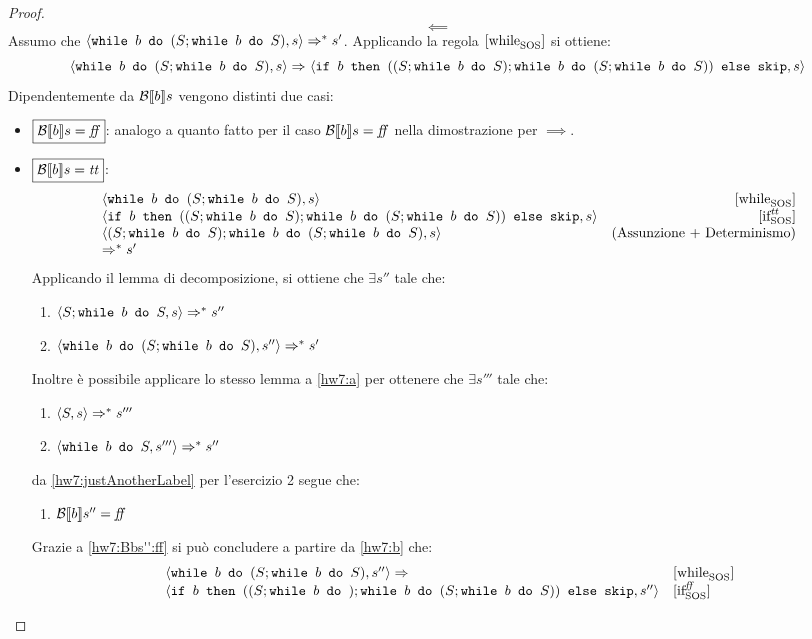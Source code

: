 {\begin{proof}
$$
\boxed{\impliedby}
$$
Assumo che $\confSs{\wbS{b}{(S;\wbS{b}{S})}}{s} \Rar{*} s'$.
Applicando la regola $\whileSOS$ si ottiene:
$$\confSs{\wbS{b}{(S;\wbS{b}{S})}}{s}
	\Rar{ }
	\confSs{\ifABC{b}{((S; \wbS{b}{S});\wbS{b}{(S;\wbS{b}{S})})}{\skipForFriends}}{s}$$
Dipendentemente da $\B{b}$ vengono distinti due casi:
\begin{itemize}
	\item $\boxed{\B{b} = \semfalse}$: analogo a quanto fatto per il caso $\B{b} = \semfalse $ nella dimostrazione per $\boxed{\implies}$. 
	\item $\boxed{\B{b} = \semtrue}$:
	$$
	\begin{array}{lr}
	\confSs{\wbS{b}{(S; \wbS{b}{S})}}{s} & \whileSOS \\
	\confSs{\ifABC{b}{((S; \wbS{b}{S});\wbS{b}{(S;\wbS{b}{S})})}{\skipForFriends}}{s} & \ifttSOS \\
	\confSs{(S; \wbS{b}{S}); \wbS{b}{(S; \wbS{b}{S})}}{s} & \text{(Assunzione + Determinismo)}\\
	\Rar{*} s'
	\end{array}
	$$
	Applicando il lemma di decomposizione, si ottiene che $\exists s''$ tale che:
	\begin{enumerate}[label=(\arabic*)]
		\item $\confSs{S; \wbS{b}{S}}{s} \Rar{*} s''$
		\label{hw7:a}
		\item $\confSs{\wbS{b}{(S; \wbS{b}{S}})}{s''} \Rar{*} s'$
		\label{hw7:b}
	\end{enumerate}
	Inoltre è possibile applicare lo stesso lemma a \ref{hw7:a} per ottenere che
	$\exists s'''$ tale che:
	\begin{enumerate}[label=(\Alph*)]
		\item $\confSs{S}{s} \Rar{*} s'''$
		\item $\confSs{\wbS{b}{S}}{s'''} \Rar{*}s''$
		\label{hw7:justAnotherLabel}
	\end{enumerate}
	da \ref{hw7:justAnotherLabel} per l'esercizio 2 segue che:
	\begin{enumerate}[label=(\Roman*)]
		\item $\B{b}'' = \semfalse$
		\label{hw7:Bbs'':ff}
	\end{enumerate}
	Grazie a \ref{hw7:Bbs'':ff} si può concludere a partire da \ref{hw7:b} che:
	$$
	\begin{array}{ll}
		\confSs{\wbS{b}{(S; \wbS{b}{S})}}{s''} \Rar{ }& \whileSOS \\
		\confSs{\ifABC{b}{((S; \wbS{b}); \wbS{b}{(S; \wbS{b}{S})})}{\skipForFriends}}{s''} & \ifffSOS \\

\end{array}$$
\end{itemize}
\end{proof}}
